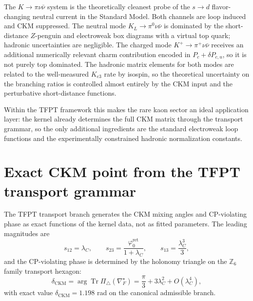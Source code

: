 \documentclass[11pt,a4paper]{article}
\theoremstyle{definition}
\theoremstyle{remark}
\DeclareMathOperator{\tr}{Tr}
\newcommand{\phiz}{\varphi_{0}^{\mathrm{ret}}}
\numberwithin{equation}{section}
\begin{document}
The $K\to\pi\nu\bar\nu$ system is the theoretically cleanest probe of the
$s\to d$ flavor-changing neutral current in the Standard Model.
Both channels are loop induced and CKM suppressed.
The neutral mode $K_L\to\pi^0\nu\bar\nu$ is dominated by the
short-distance $Z$-penguin and electroweak box diagrams with a virtual
top quark; hadronic uncertainties are negligible.
The charged mode $K^+\to\pi^+\nu\bar\nu$ receives an additional
numerically relevant charm contribution encoded in $P_c+\delta P_{c,u}$,
so it is not purely top dominated.
The hadronic matrix elements for both modes are related to the
well-measured $K_{e3}$ rate by isospin, so the theoretical uncertainty
on the branching ratios is controlled almost entirely by the CKM input and
the perturbative short-distance functions.

Within the TFPT framework this makes the rare kaon sector an ideal
application layer: the kernel already determines the full CKM matrix
through the transport grammar, so the only additional ingredients are
the standard electroweak loop functions and the experimentally
constrained hadronic normalization constants.


\section{Exact CKM point from the TFPT transport grammar}
\label{sec:ckm}

The TFPT transport branch generates the CKM mixing angles and
CP-violating phase as exact functions of the kernel data, not as fitted
parameters. The leading magnitudes are
\begin{equation}
\label{eq:ckm-angles}
s_{12}=\lambda_C,
\qquad
s_{23}=\frac{\phiz}{1+\lambda_C},
\qquad
s_{13}=\frac{\lambda_C^3}{3},
\end{equation}
and the CP-violating phase is determined by the holonomy triangle on the
$\mathbb Z_6$ family transport hexagon:
\begin{equation}
\label{eq:ckm-phase}
\delta_{\mathrm{CKM}}
=
\arg\tr\Pi_\triangle(\nabla_F^\star)
=
\frac{\pi}{3}+3\lambda_C^2+O(\lambda_C^4),
\end{equation}
with exact value $\delta_{\mathrm{CKM}}=\num{1.198}$ rad on the canonical admissible branch.
\end{document}
